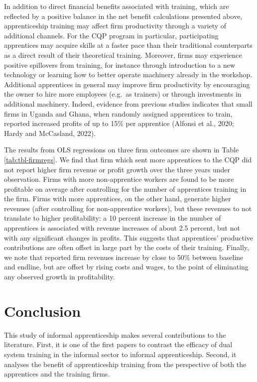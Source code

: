 \documentclass[
  11pt,
a4paper
]{report}
\begin{document}
\noindent In addition to direct financial benefits associated with training, which are reflected by a positive balance in the net benefit calculations presented above, apprenticeship training may affect firm productivity through a variety of additional channels. For the CQP program in particular, participating apprentices may acquire skills at a faster pace than their traditional counterparts as a direct result of their theoretical training. Moreover, firms may experience positive spillovers from training, for instance through introduction to a new technology or learning how to better operate machinery already in the workshop. Additional apprentices in general may improve firm productivity by encouraging the owner to hire more employees (e.g.~as trainers) or through investments in additional machinery. Indeed, evidence from previous studies indicates that small firms in Uganda and Ghana, when randomly assigned apprentices to train, reported increased profits of up to 15\% per apprentice (Alfonsi et al., 2020; Hardy and McCasland, 2022).

The results from OLS regressions on three firm outcomes are shown in Table \ref{tab:tbl-firmregs}. We find that firm which sent more apprentices to the CQP did not report higher firm revenue or profit growth over the three years under observation. Firms with more non-apprentice workers are found to be more profitable on average after controlling for the number of apprentices training in the firm. Firms with more apprentices, on the other hand, generate higher revenues (after controlling for non-apprentice workers), but these revenues to not translate to higher profitability: a 10 percent increase in the number of apprentices is associated with revenue increases of about 2.5 percent, but not with any significant changes in profits. This suggests that apprentices' productive contributions are often offset in large part by the costs of their training. Finally, we note that reported firm revenues increase by close to 50\% between baseline and endline, but are offset by rising costs and wages, to the point of eliminating any observed growth in profitability.

\hypertarget{conclusion}{%
\section{Conclusion}\label{conclusion}}

This study of informal apprenticeship makes several contributions to the literature. First, it is one of the first papers to contrast the efficacy of dual system training in the informal sector to informal apprenticeship. Second, it analyses the benefit of apprenticeship training from the perspective of both the apprentices and the training firms.
\end{document}
